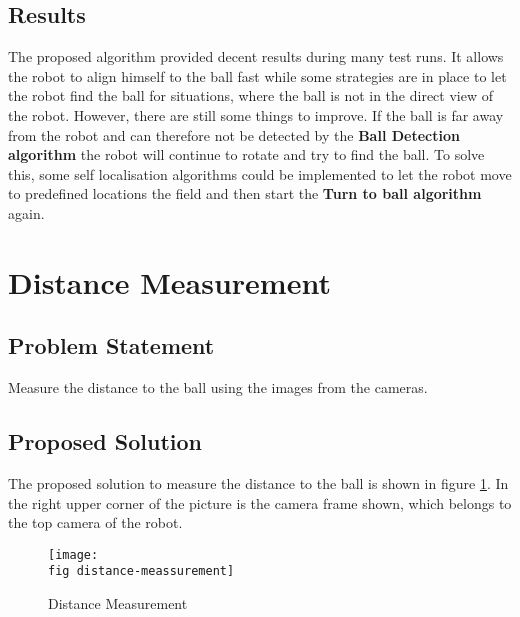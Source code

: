 \subsection*{Results}
The proposed algorithm provided decent results during many test runs. It allows the robot to align himself to the ball fast while some strategies are in place to let the robot find the ball for situations, where the ball is not in the direct view of the robot. However, there are still some things to improve. If the ball is far away from the robot and can therefore not be detected by the \textbf{Ball Detection algorithm} the robot will continue to rotate and try to find the ball. To solve this, some self localisation algorithms could be implemented to let the robot move to predefined locations the field and then start the \textbf{Turn to ball algorithm} again.

\section{Distance Measurement}
\label{j sec distance measurement}
\subsection*{Problem Statement}
Measure the distance to the ball using the images from the cameras.

\subsection*{Proposed Solution}
The proposed solution to measure the distance to the ball is shown in figure \ref{j figure distance measurement}. In the right upper corner of the picture is the camera frame shown, which belongs to the top camera of the robot.
\begin{figure}[ht]
	\texttt{[image: \\fig distance-meassurement]}
	\caption{Distance Measurement}
	\label{j figure distance measurement}
\end{figure}

